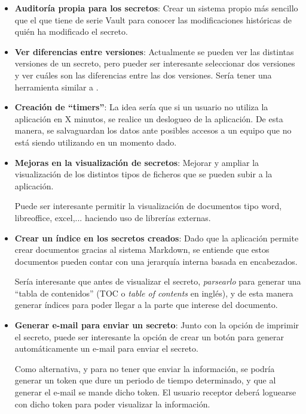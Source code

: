 \documentclass{\ClassPath/viu-tfm-template}
\begin{document}
\begin{itemize}
    \item \textbf{Auditoría propia para los secretos}: Crear un sistema propio más sencillo que el que tiene de serie Vault para conocer las modificaciones históricas de quién ha modificado el secreto.

    \item \textbf{Ver diferencias entre versiones}: Actualmente se pueden ver las distintas versiones de un secreto, pero pueder ser interesante seleccionar dos versiones y ver cuáles son las diferencias entre las dos versiones. Sería tener una herramienta similar a .

    \item \textbf{Creación de “timers”}: La idea sería que si un usuario no utiliza la aplicación en X minutos, se realice un deslogueo de la aplicación. De esta manera, se salvaguardan los datos ante posibles accesos a un equipo que no está siendo utilizando en un momento dado.

    \item \textbf{Mejoras en la visualización de secretos}: Mejorar y ampliar la visualización de los distintos tipos de ficheros que se pueden subir a la aplicación.

    Puede ser interesante permitir la visualización de documentos tipo word, libreoffice, excel,... haciendo uso de librerías externas.

    \item \textbf{Crear un índice en los secretos creados}: Dado que la aplicación permite crear documentos gracias al sistema Markdown, se entiende que estos documentos pueden contar con una jerarquía interna basada en encabezados.

    Sería interesante que antes de visualizar el secreto, \textit{parsearlo} para generar una “tabla de contenidos” (TOC o \textit{table of contents} en inglés), y de esta manera generar índices para poder llegar a la parte que interese del documento.

    \item \textbf{Generar e-mail para enviar un secreto}: Junto con la opción de imprimir el secreto, puede ser interesante la opción de crear un botón para generar automáticamente un e-mail para enviar el secreto.

    Como alternativa, y para no tener que enviar la información, se podría generar un token que dure un periodo de tiempo determinado, y que al generar el e-mail se mande dicho token. El usuario receptor deberá loguearse con dicho token para poder visualizar la información.
\end{itemize}
\end{document}
